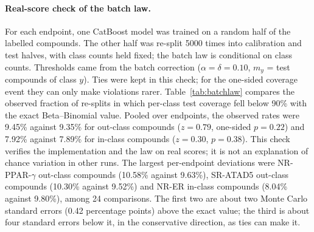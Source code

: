 \documentclass[10pt]{article}
\begin{document}
\paragraph{Real-score check of the batch law.} For each endpoint, one CatBoost model was trained on a random half of the labelled compounds. The other half was re-split 5000 times into calibration and test halves, with class counts held fixed; the batch law is conditional on class counts. Thresholds came from the batch correction ($\alpha=\delta=0.10$, $m_y$ = test compounds of class $y$). Ties were kept in this check; for the one-sided coverage event they can only make violations rarer. Table~\ref{tab:batchlaw} compares the observed fraction of re-splits in which per-class test coverage fell below 90\% with the exact Beta--Binomial value. Pooled over endpoints, the observed rates were 9.45\% against 9.35\% for out-class compounds ($z=0.79$, one-sided $p=0.22$) and 7.92\% against 7.89\% for in-class compounds ($z=0.30$, $p=0.38$). This check verifies the implementation and the law on real scores; it is not an explanation of chance variation in other runs. The largest per-endpoint deviations were NR-PPAR-$\gamma$ out-class compounds (10.58\% against 9.63\%), SR-ATAD5 out-class compounds (10.30\% against 9.52\%) and NR-ER in-class compounds (8.04\% against 9.80\%), among 24 comparisons. The first two are about two Monte Carlo standard errors (0.42 percentage points) above the exact value; the third is about four standard errors below it, in the conservative direction, as ties can make it.
\end{document}
